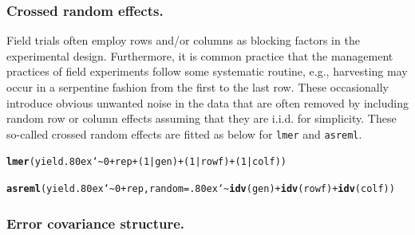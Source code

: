 \documentclass[runningheads]{llncs}\usepackage[]{graphicx}\usepackage[]{color}
\makeatletter
\newcommand{\hlnum}[1]{\textcolor[rgb]{0.686,0.059,0.569}{#1}}%
\newcommand{\hlopt}[1]{\textcolor[rgb]{0,0,0}{#1}}%
\newcommand{\hlstd}[1]{\textcolor[rgb]{0.345,0.345,0.345}{#1}}%
\newcommand{\hlkwc}[1]{\textcolor[rgb]{0.333,0.667,0.333}{#1}}%
\newcommand{\hlkwd}[1]{\textcolor[rgb]{0.737,0.353,0.396}{\textbf{#1}}}%
\newenvironment{kframe}{%
 \def\at@end@of@kframe{}%
 \ifinner\ifhmode%
  \def\at@end@of@kframe{\end{minipage}}%
  \begin{minipage}{\columnwidth}%
 \fi\fi%
 \def\FrameCommand##1{\hskip\@totalleftmargin \hskip-\fboxsep
 \colorbox{shadecolor}{##1}\hskip-\fboxsep
     \hskip-\linewidth \hskip-\@totalleftmargin \hskip\columnwidth}%
 \MakeFramed {\advance\hsize-\width
   \@totalleftmargin\z@ \linewidth\hsize
   \@setminipage}}%
 {\par\unskip\endMakeFramed%
 \at@end@of@kframe}
\newenvironment{knitrout}{}{} %
\newcommand{\mytilde}{\lower.80ex\hbox{\char`\~}}
\makeatother
\begin{document}
\subsubsection{Crossed random effects.} 

Field trials often employ rows and/or columns as blocking factors in the experimental design. Furthermore, it is common practice that the management practices of field experiments follow some systematic routine, e.g., harvesting may occur in a serpentine fashion from the first to the last row. These occasionally introduce obvious unwanted noise in the data that are often removed by including random row or column effects assuming that they are i.i.d. for simplicity. These so-called crossed random effects are fitted as below for \texttt{lmer} and \texttt{asreml}.

\begin{knitrout}
	\color{fgcolor}\begin{kframe}
		\begin{alltt}
			\hlkwd{lmer}\hlstd{(yield} \hlopt{\mytilde} \hlnum{0} \hlopt{+} \hlstd{rep} \hlopt{+} \hlstd{(}\hlnum{1} \hlopt{|} \hlstd{gen)} \hlopt{+} \hlstd{(}\hlnum{1} \hlopt{|} \hlstd{rowf)} \hlopt{+} \hlstd{(}\hlnum{1} \hlopt{|} \hlstd{colf))}
		\end{alltt}
	\end{kframe}
\end{knitrout}

\begin{knitrout}
	\color{fgcolor}\begin{kframe}
		\begin{alltt}
			\hlkwd{asreml}\hlstd{(yield} \hlopt{\mytilde} \hlnum{0} \hlopt{+} \hlstd{rep,} \hlkwc{random} \hlstd{=} \hlopt{\mytilde}\hlkwd{idv}\hlstd{(gen)} \hlopt{+} \hlkwd{idv}\hlstd{(rowf)} \hlopt{+} \hlkwd{idv}\hlstd{(colf))}
		\end{alltt}
	\end{kframe}
\end{knitrout}


\subsubsection{Error covariance structure.}
\end{document}
